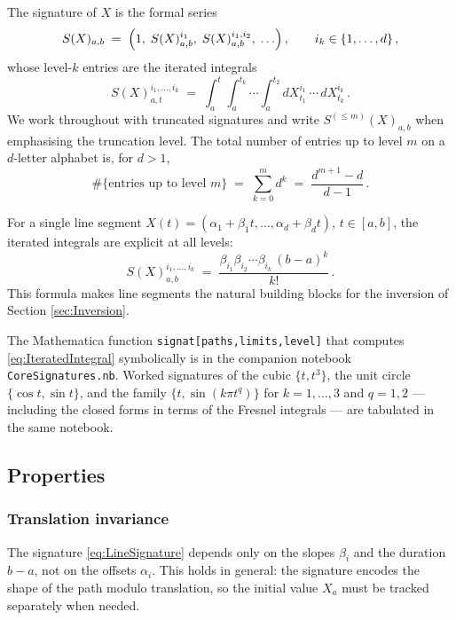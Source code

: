 \documentclass[12pt,english]{article}
\newcommand{\nbfile}[1]{\nolinkurl{#1}}
\theoremstyle{remark}
\begin{document}
The signature of $X$ is the formal series
\begin{equation}
S(X)_{a,b}\;=\;\Bigl(1,\;S(X)_{a,b}^{i_{1}},\;S(X)_{a,b}^{i_{1},i_{2}},\;\ldots\Bigr)\,,\qquad i_{k}\in\{1,\ldots,d\}\,,
\end{equation}
whose level-$k$ entries are the iterated integrals
\begin{equation}
S(X)_{a,t}^{i_{1},\ldots,i_{k}}\;=\;\int_{a}^{t}\!\int_{a}^{t_{k}}\!\!\cdots\int_{a}^{t_{2}}dX_{t_{1}}^{i_{1}}\,\cdots\,dX_{t_{k}}^{i_{k}}\,.\label{eq:IteratedIntegral}
\end{equation}
We work throughout with truncated signatures and write
$S^{(\leq m)}(X)_{a,b}$ when emphasising the truncation level. The
total number of entries up to level $m$ on a $d$-letter alphabet
is, for $d>1$,
\begin{equation}
\#\{\text{entries up to level }m\}\;=\;\sum_{k=0}^{m}d^{k}\;=\;\frac{d^{m+1}-d}{d-1}\,.\label{eq:SignSize}
\end{equation}

For a single line segment $X(t)=(\alpha_{1}+\beta_{1}t,\ldots,\alpha_{d}+\beta_{d}t)$,
$t\in[a,b]$, the iterated integrals are explicit at all levels:
\begin{equation}
S(X)_{a,b}^{i_{1},\ldots,i_{k}}\;=\;\frac{\beta_{i_{1}}\beta_{i_{2}}\cdots\beta_{i_{k}}\,(b-a)^{k}}{k!}\,.\label{eq:LineSignature}
\end{equation}
This formula makes line segments the natural building blocks for the
inversion of Section \ref{sec:Inversion}.

The Mathematica function \texttt{signat[paths,limits,level]} that
computes \eqref{eq:IteratedIntegral} symbolically is in the companion
notebook \nbfile{CoreSignatures.nb}. Worked signatures of the cubic
$\{t,t^{3}\}$, the unit circle $\{\cos t,\sin t\}$, and the family
$\{t,\sin(k\pi t^{q})\}$ for $k=1,\ldots,3$ and $q=1,2$ --- including
the closed forms in terms of the Fresnel integrals --- are tabulated
in the same notebook.

\subsection{Properties}

\subsubsection{Translation invariance}

The signature \eqref{eq:LineSignature} depends only on the slopes
$\beta_{i}$ and the duration $b-a$, not on the offsets $\alpha_{i}$.
This holds in general: the signature encodes the shape of the path
modulo translation, so the initial value $X_{a}$ must be tracked
separately when needed.
\end{document}
